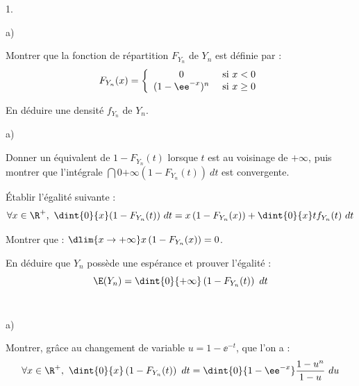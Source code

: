 \documentclass[11pt]{article}%
\begin{document}
\begin{noliste}{1.}
  \setlength{\itemsep}{4mm} %
  \setcounter{enumi}{1}
\item
  \begin{noliste}{a)}
    \setlength{\itemsep}{2mm}
  \item Montrer que la fonction de répartition $F_{Y_{n}}$ de $Y_{n}$
    est définie par :
    \[
    F_{Y_{n}}(x) = \left\{
      \begin{array}{cl}
        0 & \hbox{ si } x<0\\
        (1-\ee^{-x})^{n} & \hbox{ si } x \geq 0
      \end{array}
    \right.
    \]
    
    

    

    
  \item En déduire une densité $f_{Y_{n}}$ de $Y_{n}$.
    
    
  \end{noliste}
  
\item
  \begin{noliste}{a)}
    \setlength{\itemsep}{2mm}
  \item Donner un équivalent de $1-F_{Y_{n}}(t)$ lorsque $t$ est au
    voisinage de $ + \infty$, puis montrer que l'intégrale $
    \dint{0}{+ \infty} \left(1-F_{Y_{n}}(t) \right) \ dt$ est
    convergente.
    
    
      
  \item Établir l'égalité suivante :
    \[
    \forall x \in \R^+, \ \dint{0}{x} (1-F_{Y_{n}}(t)) \ dt =
    x\left(1-F_{Y_{n}}(x)\right) + \dint{0}{x} t f_{Y_{n}}(t) \ dt
    \]
    
    
    
  \item Montrer que : $\dlim{ x \to + \infty} x\left(1-F_{Y_{n}}(x)
    \right) = 0$.
    
    
    
  \item En déduire que $Y_{n}$ possède une espérance et prouver
    l'égalité :
    \[
    \E(Y_{n}) = \dint{0}{+ \infty} \left(1-F_{Y_{n}}(t)\right) \ dt
    \]~\\[-1.2cm]
    
    
  \end{noliste}



  
\item
  \begin{noliste}{a)}
    \setlength{\itemsep}{2mm}
  \item Montrer, grâce au changement de variable $u = 1-\ee^{-t}$, que
    l'on a :
    \[
    \forall x \in \R^+, \ \dint{0}{x} \left(1-F_{Y_{n}}(t)\right) \ dt
    = \dint{0}{1 - \ee^{-x}} \dfrac{1-u^{n}}{1-u} \ du
    \]
    

\end{noliste}
\end{noliste}
\end{document}
